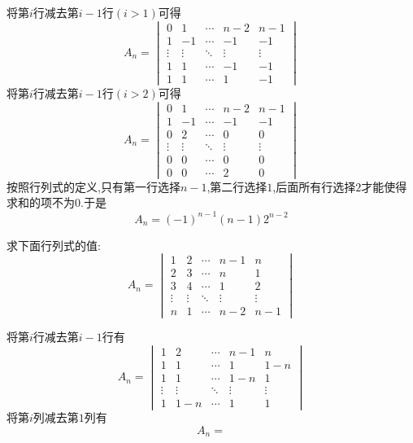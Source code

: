 \documentclass{ctexart}
\begin{document}
\begin{solution}
    将第$i$行减去第$i-1$行$(i>1)$可得
    \[A_n=\begin{vmatrix}
        0&1&\cdots&n-2&n-1\\
        1&-1&\cdots&-1&-1\\
        \vdots&\vdots&\ddots&\vdots&\vdots\\
        1&1&\cdots&-1&-1\\
        1&1&\cdots&1&-1
    \end{vmatrix}\]
    将第$i$行减去第$i-1$行$(i>2)$可得
    \[A_n=\begin{vmatrix}
        0&1&\cdots&n-2&n-1\\
        1&-1&\cdots&-1&-1\\
        0&2&\cdots&0&0\\
        \vdots&\vdots&\ddots&\vdots&\vdots\\
        0&0&\cdots&0&0\\
        0&0&\cdots&2&0
    \end{vmatrix}\]
    按照行列式的定义,只有第一行选择$n-1$,第二行选择$1$,后面所有行选择$2$才能使得求和的项不为$0$.于是
    \[A_n=(-1)^{n-1}(n-1)2^{n-2}\]
\end{solution}
\begin{problem}
    求下面行列式的值:
    \[A_n=\begin{vmatrix}
        1&2&\cdots&n-1&n\\
        2&3&\cdots&n&1\\
        3&4&\cdots&1&2\\
        \vdots&\vdots&\ddots&\vdots&\vdots\\
        n&1&\cdots&n-2&n-1
    \end{vmatrix}\]
\end{problem}
\begin{solution}
    将第$i$行减去第$i-1$行有
    \[A_n=\begin{vmatrix}
        1&2&\cdots&n-1&n\\
        1&1&\cdots&1&1-n\\
        1&1&\cdots&1-n&1\\
        \vdots&\vdots&\ddots&\vdots&\vdots\\
        1&1-n&\cdots&1&1
    \end{vmatrix}\]
    将第$i$列减去第$1$列有
    \[A_n=\]
\end{solution}
\end{document}
